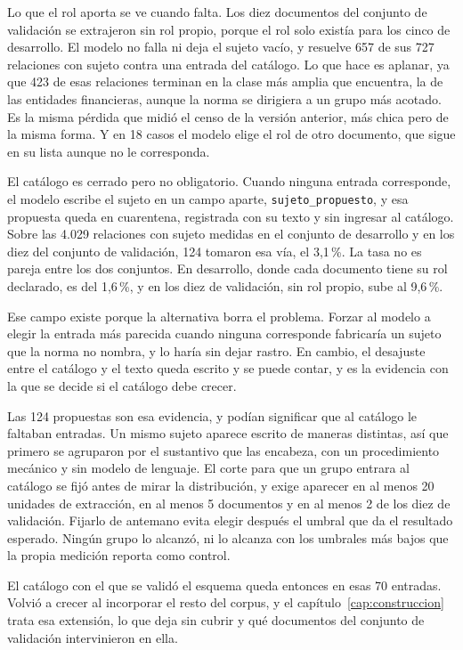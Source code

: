 \documentclass[12pt,a4paper]{report}
\begin{document}
Lo que el rol aporta se ve cuando falta. Los diez documentos del conjunto de validación se extrajeron sin rol propio, porque el rol solo existía para los cinco de desarrollo. El modelo no falla ni deja el sujeto vacío, y resuelve 657 de sus 727 relaciones con sujeto contra una entrada del catálogo. Lo que hace es aplanar, ya que 423 de esas relaciones terminan en la clase más amplia que encuentra, la de las entidades financieras, aunque la norma se dirigiera a un grupo más acotado. Es la misma pérdida que midió el censo de la versión anterior, más chica pero de la misma forma. Y en 18 casos el modelo elige el rol de otro documento, que sigue en su lista aunque no le corresponda.

El catálogo es cerrado pero no obligatorio. Cuando ninguna entrada corresponde, el modelo escribe el sujeto en un campo aparte, \texttt{sujeto\_propuesto}, y esa propuesta queda en cuarentena, registrada con su texto y sin ingresar al catálogo. Sobre las 4.029 relaciones con sujeto medidas en el conjunto de desarrollo y en los diez del conjunto de validación, 124 tomaron esa vía, el 3,1\,\%. La tasa no es pareja entre los dos conjuntos. En desarrollo, donde cada documento tiene su rol declarado, es del 1,6\,\%, y en los diez de validación, sin rol propio, sube al 9,6\,\%.

Ese campo existe porque la alternativa borra el problema. Forzar al modelo a elegir la entrada más parecida cuando ninguna corresponde fabricaría un sujeto que la norma no nombra, y lo haría sin dejar rastro. En cambio, el desajuste entre el catálogo y el texto queda escrito y se puede contar, y es la evidencia con la que se decide si el catálogo debe crecer.

Las 124 propuestas son esa evidencia, y podían significar que al catálogo le faltaban entradas. Un mismo sujeto aparece escrito de maneras distintas, así que primero se agruparon por el sustantivo que las encabeza, con un procedimiento mecánico y sin modelo de lenguaje. El corte para que un grupo entrara al catálogo se fijó antes de mirar la distribución, y exige aparecer en al menos 20 unidades de extracción, en al menos 5 documentos y en al menos 2 de los diez de validación. Fijarlo de antemano evita elegir después el umbral que da el resultado esperado. Ningún grupo lo alcanzó, ni lo alcanza con los umbrales más bajos que la propia medición reporta como control.

El catálogo con el que se validó el esquema queda entonces en esas 70 entradas. Volvió a crecer al incorporar el resto del corpus, y el capítulo~\ref{cap:construccion} trata esa extensión, lo que deja sin cubrir y qué documentos del conjunto de validación intervinieron en ella.
\end{document}
